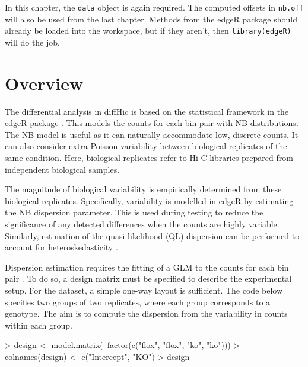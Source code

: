 \documentclass[12pt]{report}
\renewenvironment{Schunk}{\vspace{0pt}}{\vspace{0pt}}
\newcommand{\edgeR}{edgeR}
\newcommand{\pkgname}{diffHic}
\newcommand{\code}[1]{{\small\texttt{#1}}}
\newenvironment{combox}
{ \begin{shaded}\begin{center}\begin{minipage}[t]{0.95\textwidth} }
{ \end{minipage}\end{center}\end{shaded} }
\begin{document}
\begin{combox}
In this chapter, the \code{data} object is again required.
The computed offsets in \code{nb.off} will also be used from the last chapter.
Methods from the \edgeR{} package should already be loaded into the workspace, but if they aren't, then \code{library(edgeR)} will do the job.
\end{combox}

\section{Overview}
The differential analysis in \pkgname{} is based on the statistical framework in the \edgeR{} package \citep{edgeR}.
This models the counts for each bin pair with NB distributions.
The NB model is useful as it can naturally accommodate low, discrete counts.
It can also consider extra-Poisson variability between biological replicates of the same condition.
Here, biological replicates refer to Hi-C libraries prepared from independent biological samples.

The magnitude of biological variability is empirically determined from these biological replicates.
Specifically, variability is modelled in \edgeR{} by estimating the NB dispersion parameter.
This is used during testing to reduce the significance of any detected differences when the counts are highly variable.
Similarly, estimation of the quasi-likelihood (QL) dispersion can be performed to account for heteroskedasticity \citep{lund2012ql}. 

Dispersion estimation requires the fitting of a GLM to the counts for each bin pair \citep{mccarthy2012glm}. 
To do so, a design matrix must be specified to describe the experimental setup.
For the \citeauthor{sofueva2013cohesin} dataset, a simple one-way layout is sufficient.
The code below specifies two groups of two replicates, where each group corresponds to a genotype.
The aim is to compute the dispersion from the variability in counts within each group.

\begin{Schunk}
\begin{Sinput}
> design <- model.matrix(~factor(c("flox", "flox", "ko", "ko")))
> colnames(design) <- c("Intercept", "KO")
> design
\end{Sinput}
\end{Schunk}
\end{document}
